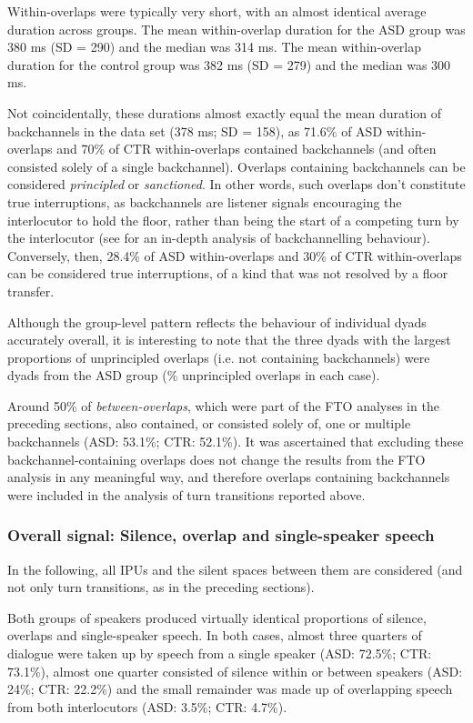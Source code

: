 Within-overlaps were typically very short, with an almost identical average duration across groups. The mean within-overlap duration for the ASD group was 380 ms (SD = 290) and the median was 314 ms. The mean within-overlap duration for the control group was 382 ms (SD = 279) and the median was 300 ms.

Not coincidentally, these durations almost exactly equal the mean duration of backchannels in the data set (378 ms; SD = 158), as 71.6\% of ASD within-overlaps and 70\% of CTR within-overlaps contained backchannels (and often consisted solely of a single backchannel). Overlaps containing backchannels can be considered \textit{principled} or \textit{sanctioned}. In other words, such overlaps don't constitute true interruptions, as backchannels are listener signals encouraging the interlocutor to hold the floor, rather than being the start of a competing turn by the interlocutor (see  for an in-depth analysis of backchannelling behaviour). Conversely, then, 28.4\% of ASD within-overlaps and 30\% of CTR within-overlaps can be considered true interruptions, of a kind that was not resolved by a floor transfer.

Although the group-level pattern reflects the behaviour of individual dyads accurately overall, it is interesting to note that the three dyads with the largest proportions of unprincipled overlaps (i.e. not containing backchannels) were dyads from the ASD group (\% unprincipled overlaps in each case).

Around 50\% of \emph{between-overlaps}, which were part of the FTO analyses in the pre\-ced\-ing sections, also contained, or consisted solely of, one or multiple back\-chan\-nels (ASD: 53.1\%; CTR: 52.1\%). It was ascertained that excluding these back\-chan\-nel-containing overlaps does not change the results from the FTO analysis in any meaningful way, and therefore overlaps containing backchannels were included in the analysis of turn transitions reported above.


\subsubsection{Overall signal: Silence, overlap and single-speaker speech}\label{turntaking_results_signal_signal}

In the following, all IPUs and the silent spaces between them are considered (and not only turn transitions, as in the preceding sections).

Both groups of speakers produced virtually identical proportions of silence, overlaps and single-speaker speech. In both cases, almost three quarters of dialogue were taken up by speech from a single speaker (ASD: 72.5\%; CTR: 73.1\%), almost one quarter consisted of silence within or between speakers (ASD: 24\%; CTR: 22.2\%) and the small remainder was made up of overlapping speech from both interlocutors (ASD: 3.5\%; CTR: 4.7\%).

